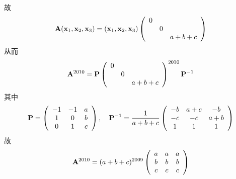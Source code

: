 \begin{frame}
\begin{footnotesize}
故
$$
\mathbf{A}(\mathbf{x}_1,\mathbf{x}_2,\mathbf{x}_3)=(\mathbf{x}_1,\mathbf{x}_2,\mathbf{x}_3)\left(
\begin{array}{ccc}
0&&\\
&0&\\
&&a+b+c
\end{array}
\right)
$$
从而
$$
\mathbf{A}^{2010}=\mathbf{P}\left(
\begin{array}{ccc}
0&&\\
&0&\\
&&a+b+c
\end{array}
\right)^{2010}\mathbf{P}^{-1}
$$
其中
$$
\mathbf{P}=\left(
\begin{array}{ccc}
-1&-1&a\\
1&0&b\\
0&1&c
\end{array}
\right), \quad
\mathbf{P}^{-1}=\frac1{a+b+c}\left(
\begin{array}{ccc}
-b&a+c&-b\\
-c&-c&a+b\\
1&1&1
\end{array}
\right)
$$
故
$$
\mathbf{A}^{2010}= (a+b+c)^{2009}
\left(
\begin{array}{ccc}
a&a&a\\
b&b&b\\
c&c&c
\end{array}
\right)
$$
\end{footnotesize}
\end{frame}

